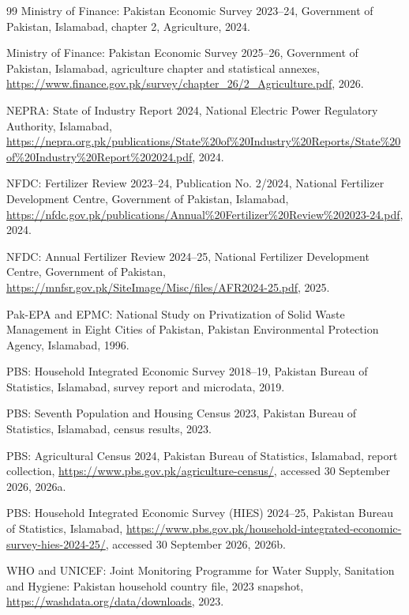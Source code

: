 \documentclass[essd]{copernicus}
\begin{document}
\begin{thebibliography}{99}
Ministry of Finance: Pakistan Economic Survey 2023--24, Government of Pakistan, Islamabad, chapter 2, Agriculture, 2024.

Ministry of Finance: Pakistan Economic Survey 2025--26, Government of Pakistan, Islamabad, agriculture chapter and statistical annexes, \url{https://www.finance.gov.pk/survey/chapter_26/2_Agriculture.pdf}, 2026.

NEPRA: State of Industry Report 2024, National Electric Power Regulatory Authority, Islamabad, \url{https://nepra.org.pk/publications/State%20of%20Industry%20Reports/State%20of%20Industry%20Report%202024.pdf}, 2024.

NFDC: Fertilizer Review 2023--24, Publication No. 2/2024, National Fertilizer Development Centre, Government of Pakistan, Islamabad, \url{https://nfdc.gov.pk/publications/Annual%20Fertilizer%20Review%202023-24.pdf}, 2024.

NFDC: Annual Fertilizer Review 2024--25, National Fertilizer Development Centre, Government of Pakistan, \url{https://mnfsr.gov.pk/SiteImage/Misc/files/AFR2024-25.pdf}, 2025.

Pak-EPA and EPMC: National Study on Privatization of Solid Waste Management in Eight Cities of Pakistan, Pakistan Environmental Protection Agency, Islamabad, 1996.

PBS: Household Integrated Economic Survey 2018--19, Pakistan Bureau of Statistics, Islamabad, survey report and microdata, 2019.

PBS: Seventh Population and Housing Census 2023, Pakistan Bureau of Statistics, Islamabad, census results, 2023.

PBS: Agricultural Census 2024, Pakistan Bureau of Statistics, Islamabad, report collection, \url{https://www.pbs.gov.pk/agriculture-census/}, accessed 30 September 2026, 2026a.

PBS: Household Integrated Economic Survey (HIES) 2024--25, Pakistan Bureau of Statistics, Islamabad, \url{https://www.pbs.gov.pk/household-integrated-economic-survey-hies-2024-25/}, accessed 30 September 2026, 2026b.

WHO and UNICEF: Joint Monitoring Programme for Water Supply, Sanitation and Hygiene: Pakistan household country file, 2023 snapshot, \url{https://washdata.org/data/downloads}, 2023.


\end{thebibliography}
\end{document}
